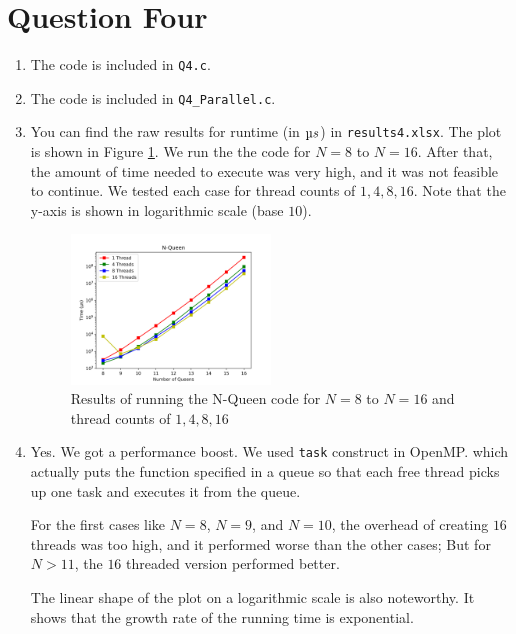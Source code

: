 \documentclass[12pt]{article}
\begin{document}
\newpage

\section{Question Four}

\begin{enumerate}[label=\alph*.]
	
	\item 
		The code is included in \Verb+Q4.c+.
	
	\item 
		The code is included in \Verb+Q4_Parallel.c+.
		
	\item 
	You can find the raw results for runtime (in $\micro s$) in \Verb+results4.xlsx+. The plot is shown in Figure \ref{fig:8}. We run the the code for $N=8$ to $N=16$. After that, the amount of time needed to execute was very high, and it was not feasible to continue. We tested each case for thread counts of $1,4,8,16$. Note that the y-axis is shown in logarithmic scale (base $10$).
	
	
	\begin{figure}[H]
		\centering
		\includegraphics[width=0.5\textwidth]{./images/Q4/N-Queen.png}	
		\cprotect\caption{Results of running the N-Queen code for $N=8$ to $N=16$ and thread counts of $1,4,8,16$}
		\label{fig:8}
	\end{figure}
	
	
	\item 
	Yes. We got a performance boost. We used \Verb+task+ construct in OpenMP. which actually puts the function specified in a queue so that each free thread picks up one task and executes it from the queue.

	For the first cases like $N=8$, $N=9$, and $N=10$, the overhead of creating $16$ threads was too high, and it performed worse than the other cases; But for $N>11$, the $16$ threaded version performed better. 
	
	The linear shape of the plot on a logarithmic scale is also noteworthy. It shows that the growth rate of the running time is exponential.
	
	
\end{enumerate}

\newpage
\end{document}

